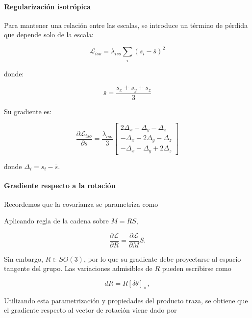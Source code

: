 \paragraph{Regularización isotrópica}

Para mantener una relación entre las escalas, se introduce un término de pérdida que depende solo de la escala:

\begin{equation}
\mathcal{L}_{iso}
=
\lambda_{iso}
\sum_i (s_i - \bar{s})^2
\end{equation}

\noindent donde:

\begin{equation}
\bar{s} = \frac{s_x + s_y + s_z}{3}
\end{equation}

Su gradiente es:

\begin{equation}
\frac{\partial \mathcal{L}_{iso}}{\partial s}
=
\frac{\lambda_{iso}}{3}
\begin{bmatrix}
2\Delta_x - \Delta_y - \Delta_z \\
-\Delta_x + 2\Delta_y - \Delta_z \\
-\Delta_x - \Delta_y + 2\Delta_z
\end{bmatrix}
\end{equation}

\noindent donde $\Delta_i = s_i - \bar{s}$.


\paragraph{Gradiente respecto a la rotación}

Recordemos que la covarianza se parametriza como

Aplicando regla de la cadena sobre $M = RS$,

\begin{equation}
\frac{\partial \mathcal{L}}{\partial R}
=
\frac{\partial \mathcal{L}}{\partial M} S .
\end{equation}

Sin embargo, $R \in SO(3)$, por lo que su gradiente debe proyectarse al
espacio tangente del grupo. Las variaciones admisibles de $R$ pueden
escribirse como

\begin{equation}
dR = R[\delta\theta]_\times ,
\end{equation}

Utilizando esta parametrización y propiedades del producto traza, se obtiene
que el gradiente respecto al vector de rotación viene dado por

